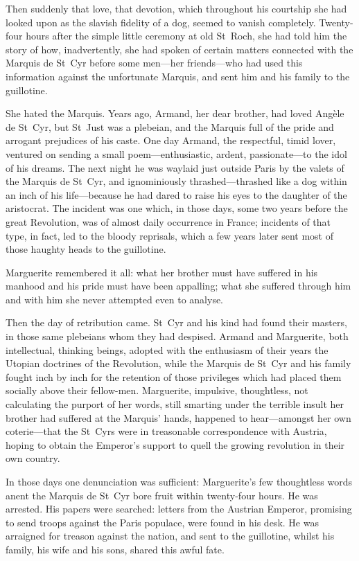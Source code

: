 Then suddenly that love, that devotion, which throughout his courtship she had looked upon as the slavish fidelity of a dog, seemed to vanish completely. Twenty-four hours after the simple little ceremony at old St~Roch, she had told him the story of how, inadvertently, she had spoken of certain matters connected with the Marquis de St~Cyr before some men—her friends—who had used this information against the unfortunate Marquis, and sent him and his family to the guillotine.

She hated the Marquis. Years ago, Armand, her dear brother, had loved Angèle de St~Cyr, but St~Just was a plebeian, and the Marquis full of the pride and arrogant prejudices of his caste. One day Armand, the respectful, timid lover, ventured on sending a small poem—enthusiastic, ardent, passionate—to the idol of his dreams. The next night he was waylaid just outside Paris by the valets of the Marquis de St~Cyr, and ignominiously thrashed—thrashed like a dog within an inch of his life—because he had dared to raise his eyes to the daughter of the aristocrat. The incident was one which, in those days, some two years before the great Revolution, was of almost daily occurrence in France; incidents of that type, in fact, led to the bloody reprisals, which a few years later sent most of those haughty heads to the guillotine.

Marguerite remembered it all: what her brother must have suffered in his manhood and his pride must have been appalling; what she suffered through him and with him she never attempted even to analyse.

Then the day of retribution came. St~Cyr and his kind had found their masters, in those same plebeians whom they had despised. Armand and Marguerite, both intellectual, thinking beings, adopted with the enthusiasm of their years the Utopian doctrines of the Revolution, while the Marquis de St~Cyr and his family fought inch by inch for the retention of those privileges which had placed them socially above their fellow-men. Marguerite, impulsive, thoughtless, not calculating the purport of her words, still smarting under the terrible insult her brother had suffered at the Marquis' hands, happened to hear—amongst her own coterie—that the St~Cyrs were in treasonable correspondence with Austria, hoping to obtain the Emperor's support to quell the growing revolution in their own country.

In those days one denunciation was sufficient: Marguerite's few thoughtless words anent the Marquis de St~Cyr bore fruit within twenty-four hours. He was arrested. His papers were searched: letters from the Austrian Emperor, promising to send troops against the Paris populace, were found in his desk. He was arraigned for treason against the nation, and sent to the guillotine, whilst his family, his wife and his sons, shared this awful fate.


